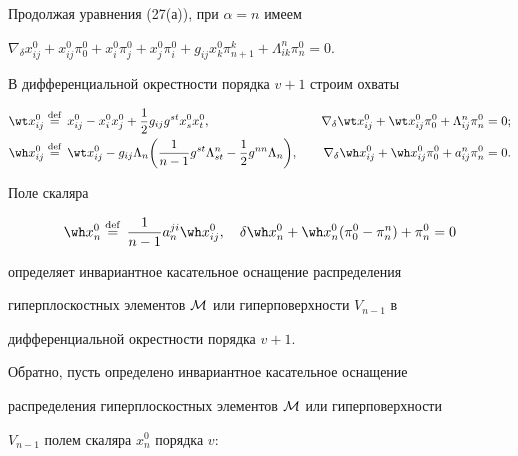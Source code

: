  


\begin{pf} 


Продолжая уравнения (27(а)), при $\alpha=n$ имеем 


$\nabla_\delta x^0_{ij}+x^0_{ij}\pi^0_0+x^0_i \pi^0_j+x^0_j \pi^0_i+ 


g_{ij}x^0_k \pi^k_{n+1}+\Lambda^n_{ik}\pi^0_n=0.$ 


В дифференциальной окрестности порядка $v+1$ строим охваты 


\begin{alignat*}{2} 


\wt x^0_{ij}&\eqdef x^0_{ij}-x^0_ix^0_j+\frac{1}{2} 


g_{ij}g^{s t}x^0_s x^0_t, &\quad 


\nabla_\delta\wt x^0_{ij}+\wt x^0_{ij}\pi^0_0+ 


\Lambda^n_{ij}\pi^0_n&=0;\\ 


% 


\wh x^0_{ij}&\eqdef\wt x^0_{ij}-g_{ij}\Lambda_n 


\bigg(\frac{1}{n-1}g^{s t}\Lambda^n_{s t}-\frac{1}{2} 


g^{n n}\Lambda_n\bigg), &\quad \nabla_\delta\wh x^0_{ij}+ 


\wh x^0_{ij}\pi^0_0+a^n_{ij}\pi^0_n&=0. 


\end{alignat*} 


Поле скаляра


$$ 


\wh x^0_n\eqdef\frac{1}{n-1}a^{j i}_n\wh x^0_{ij},\quad 


\delta\wh x^0_n+\wh x^0_n(\pi^0_0-\pi^n_n)+\pi^0_n=0 


$$ 


определяет инвариантное касательное оснащение распределения 


гиперплоскостных элементов $\cal M$ или гиперповерхности $V_{n-1}$ в 


дифференциальной окрестности порядка $v+1$. 


 


Обратно, пусть определено инвариантное касательное оснащение 


распределения гиперплоскостных элементов $\cal M$ или гиперповерхности 


$V_{n-1}$ полем скаляра $x^0_n$ порядка $v$:


\begin{equation} 



\end{equation}
\end{pf}
